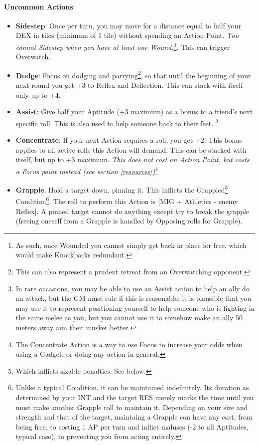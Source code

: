 \paragraph{Uncommon Actions}
\begin{itemize}
    \item \textbf{Sidestep}: Once per turn, you may move for a distance equal to half your DEX in tiles (minimum of 1 tile) without spending an Action Point. \textit{You cannot Sidestep when you have at least one Wound.\footnote{As such, once Wounded you cannot simply get back in place for free, which would make Knockbacks redundant.}}. This can trigger Overwatch.
    \item \textbf{Dodge}: Focus on dodging and parrying\footnote{This can also represent a prudent retreat from an Overwatching opponent.}, so that until the beginning of your next round you get +3 to Reflex and Deflection. This can stack with itself only up to +4.
    \item \textbf{Assist}: Give half your Aptitude (+3 maximum) as a bonus to a friend's next specific roll. This is also used to help someone back to their feet. \footnote{In rare occasions, you may be able to use an Assist action to help an ally do an attack, but the GM must rule if this is reasonable: it is plausible that you may use it to represent positioning yourself to help someone who is fighting in the same melee as you, but you cannot use it to somehow make an ally 50 meters away aim their musket better.}
    \item \textbf{Concentrate}: If your next Action requires a roll, you get +2. This bonus applies to all active rolls this Action will demand. This can be stacked with itself, but up to +3 maximum. \textit{This does not cost an Action Point, but costs a Focus point instead (see section \ref{resources})}\footnote{The Concentrate Action is a way to use Focus to increase your odds when using a Gadget, or doing any action in general.}
    \item \textbf{Grapple}: Hold a target down, pinning it. This inflicts the Grappled\footnote{Which inflicts sizable penalties. See below.} Condition\footnote{Unlike a typical Condition, it can be maintained indefinitely. Its duration as determined by your INT and the target RES merely marks the time until you must make another Grapple roll to maintain it. Depending on your size and strength and that of the target, maintaing a Grapple can have any cost, from being free, to costing 1 AP per turn and inflict maluses (-2 to all Aptitudes, typical case), to preventing you from acting entirely.}. The roll to perform this Action is [MIG + Athletics - enemy Reflex]. A pinned target cannot do anything except try to break the grapple (freeing oneself from a Grapple is handled by Opposing rolls for Grapple). \\

\end{itemize}
